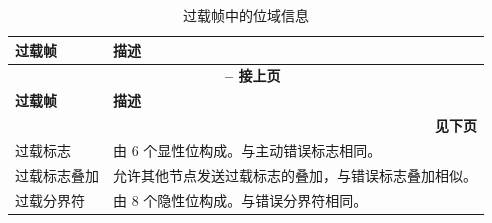 \begin{longtable}[c]{|p{2.5cm}|p{13cm}|} 
    
  \caption{过载帧中的位域信息}
  \label{tab:twai-overload-frame} 
  \\\hline
  \rowcolor{lightgray}
  \textbf{过载帧} & \textbf{描述}
  \\\hline
  \endfirsthead
  
  \multicolumn{2}{c}{\bfseries \tablename\ \thetable{} -- 接上页}\\  \hline
  
  \rowcolor{lightgray}
    \textbf{过载帧} & \textbf{描述}
  \\\hline
  \endhead
  
  \multicolumn{2}{r}{\textbf{见下页}} \\
  \endfoot
  \endlastfoot
  
    过载标志 & 由 6 个显性位构成。与主动错误标志相同。
          \\\hline
    过载标志叠加 & 允许其他节点发送过载标志的叠加，与错误标志叠加相似。
           \\\hline
    过载分界符 & 由 8 个隐性位构成。与错误分界符相同。              \\\hline
\end{longtable}
